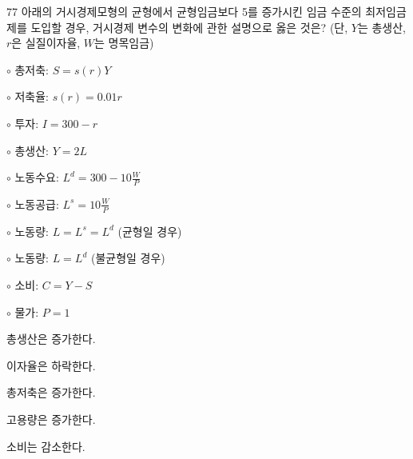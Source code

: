 \begin{question}{77}
아래의 거시경제모형의 균형에서 균형임금보다 5를 증가시킨 임금 수준의 최저임금제를 도입할 경우, 거시경제 변수의 변화에 관한 설명으로 옳은 것은? (단, $Y$는 총생산, $r$은 실질이자율, $W$는 명목임금)
\begin{framedtext}
$\circ$ 총저축: $S=s(r)Y$ \par
$\circ$ 저축율: $s(r)=0.01r$ \par
$\circ$ 투자: $I=300-r$ \par
$\circ$ 총생산: $Y=2L$ \par
$\circ$ 노동수요: $L^{d}=300-10\frac{W}{P}$ \par
$\circ$ 노동공급: $L^{s}=10\frac{W}{P}$ \par
$\circ$ 노동량: $L=L^{s}=L^{d}$ (균형일 경우) \par
$\circ$ 노동량: $L=L^{d}$ (불균형일 경우) \par
$\circ$ 소비: $C=Y-S$ \par
$\circ$ 물가: $P=1$
\end{framedtext}
\begin{choices}
  \item 총생산은 증가한다.
  \item 이자율은 하락한다.
  \item 총저축은 증가한다.
  \item 고용량은 증가한다.
  \item 소비는 감소한다.
\end{choices}
\end{question}
